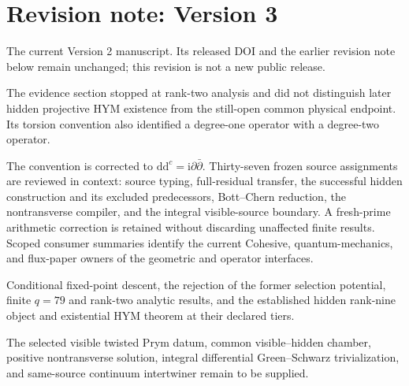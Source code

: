 \documentclass[11pt]{article}
\theoremstyle{definition}
\theoremstyle{remark}
\newcommand{\dd}{\mathrm d}
\newcommand{\ii}{\mathrm i}
\begin{document}
\section*{Revision note: Version 3}
\begin{description}[leftmargin=2.4cm,style=nextline]
\item[Supersedes]
The current Version 2 manuscript.  Its released DOI and the earlier revision
note below remain unchanged; this revision is not a new public release.
\item[Reason]
The evidence section stopped at rank-two analysis and did not distinguish
later hidden projective HYM existence from the still-open common physical
endpoint.  Its torsion convention also identified a degree-one operator with
a degree-two operator.
\item[Resolution]
The convention is corrected to \(\dd\dd^c=\ii\partial\bar\partial\).
Thirty-seven frozen source assignments are reviewed in context: source
typing, full-residual transfer, the successful hidden construction and its
excluded predecessors, Bott--Chern reduction, the nontransverse compiler,
and the integral visible-source boundary.  A fresh-prime arithmetic
correction is retained without discarding unaffected finite results.
Scoped consumer summaries identify the current Cohesive, quantum-mechanics,
and flux-paper owners of the geometric and operator interfaces.
\item[Retained]
Conditional fixed-point descent, the rejection of the former selection
potential, finite \(q=79\) and rank-two analytic results, and the established
hidden rank-nine object and existential HYM theorem at their declared tiers.
\item[Open boundary]
The selected visible twisted Prym datum, common visible--hidden chamber,
positive nontransverse solution, integral differential Green--Schwarz
trivialization, and same-source continuum intertwiner remain to be supplied.
\end{description}
\end{document}
